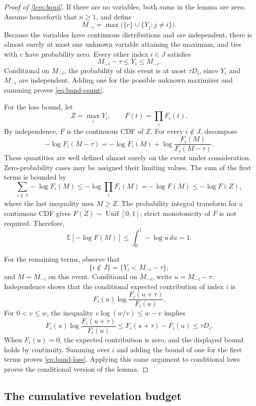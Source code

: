 \documentclass[11pt]{article}
\newcommand{\E}{\mathbb{E}}
\theoremstyle{definition}
\theoremstyle{remark}
\begin{document}
\begin{proof}[Proof of \cref{lem:band}]
If there are no variables, both sums in the lemma are zero.  Assume
henceforth that $n\ge1$, and define
\[
 M_{-i}=\max\bigl(\{c\}\cup\{Y_j:j\ne i\}\bigr).
\]
Because the variables have continuous distributions and are independent,
there is almost surely at most one unknown variable attaining the
maximum, and ties with $c$ have probability zero.  Every other index
$i\in J$ satisfies
\[
 M_{-i}-\tau\le Y_i\le M_{-i}.
\]
Conditional on $M_{-i}$, the probability of this event is at most
$\tau D_i$, since $Y_i$ and $M_{-i}$ are independent.  Adding one for
the possible unknown maximizer and summing proves
\cref{eq:band-count}.

For the loss bound, let
\[
 Z=\max_iY_i,\qquad F(t)=\prod_iF_i(t).
\]
By independence, $F$ is the continuous CDF of $Z$.  For every
$i\notin J$, decompose
\[
 -\log F_i(M-\tau)
 =-\log F_i(M)
   +\log\frac{F_i(M)}{F_i(M-\tau)}.
\]
These quantities are well defined almost surely on the event under
consideration.  Zero-probability cases may be assigned their limiting
values.  The sum of the first terms is bounded by
\[
 \sum_{i\notin J}-\log F_i(M)
 \le-\log\prod_iF_i(M)
 =-\log F(M)
 \le-\log F(Z),
\]
where the last inequality uses $M\ge Z$.  The probability integral
transform for a continuous CDF gives $F(Z)\sim\operatorname{Unif}[0,1]$;
strict monotonicity of $F$ is not required.  Therefore,
\[
 \E[-\log F(M)]\le\int_0^1-\log u\,du=1.
\]

For the remaining terms, observe that
\[
 \{i\notin J\}=\{Y_i<M_{-i}-\tau\},
\]
and $M=M_{-i}$ on this event.  Conditional on $M_{-i}$, write
$u=M_{-i}-\tau$.  Independence shows that the conditional expected
contribution of index $i$ is
\[
 F_i(u)\log\frac{F_i(u+\tau)}{F_i(u)}.
\]
For $0<v\le w$, the inequality
$v\log(w/v)\le w-v$ implies
\[
 F_i(u)\log\frac{F_i(u+\tau)}{F_i(u)}
 \le F_i(u+\tau)-F_i(u)
 \le\tau D_i.
\]
When $F_i(u)=0$, the expected contribution is zero, and the displayed
bound holds by continuity.  Summing over $i$ and adding the bound of one
for the first terms proves \cref{eq:band-loss}.  Applying this same
argument to conditional laws proves the conditional version of the
lemma.
\end{proof}

\subsection{The cumulative revelation budget}
\end{document}
